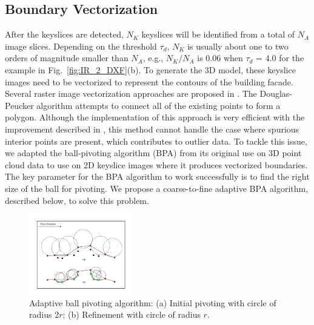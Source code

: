 \documentclass[review]{acmsiggraph}       %
\newcommand{\Figb}[1]{Fig.~\ref{fig:#1}(b)}
\begin{document}
\subsection{Boundary Vectorization}
\label{sec:BPA}

After the keyslices are detected, $N_K$ keyslices will be identified
from a total of $N_A$ image slices.
Depending on the threshold $\tau_{d}$, $N_K$ is usually about one to two
orders of magnitude smaller than $N_A$, e.g., $N_K/N_A$ is 0.06 when
$\tau_d$ = 4.0 for the example in \Figb{IR_2_DXF}.
To generate the 3D model, these keyslice images need to be vectorized to
represent the contours of the building facade.
Several raster image vectorization approaches are proposed in
\cite{DP_AAKMT,DP_DP}.
The Douglas-Peucker algorithm attempts to connect all of the existing points
to form a polygon.
Although the implementation of this approach is very efficient with the
improvement described in \cite{DP_HS}, this method cannot handle the case
where spurious interior points are present, which contributes to outlier data.
To tackle this issue, we adapted the ball-pivoting algorithm (BPA)
\cite{BPA_BMRS} from its original use on 3D point cloud data to use on
2D keyslice images where it produces vectorized boundaries.
The key parameter for the BPA algorithm to work successfully is to
find the right size of the ball for pivoting.
We propose a coarse-to-fine adaptive BPA algorithm, described below,
to solve this problem.

\begin{figure}[hbtp]
\centering
\includegraphics[width=0.4\textwidth]{figures/BPA.pdf}
\caption{Adaptive ball pivoting algorithm:
(a) Initial pivoting with circle of radius 2$r$;
(b) Refinement with circle of radius $r$.}
\label{fig:BPA}
\end{figure}
\end{document}
